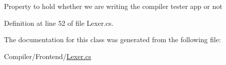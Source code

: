 Property to hold whether we are writing the compiler tester app or not 



Definition at line 52 of file Lexer.\+cs.



The documentation for this class was generated from the following file\+:\begin{DoxyCompactItemize}
\item 
Compiler/\+Frontend/\hyperlink{_lexer_8cs}{Lexer.\+cs}\end{DoxyCompactItemize}
